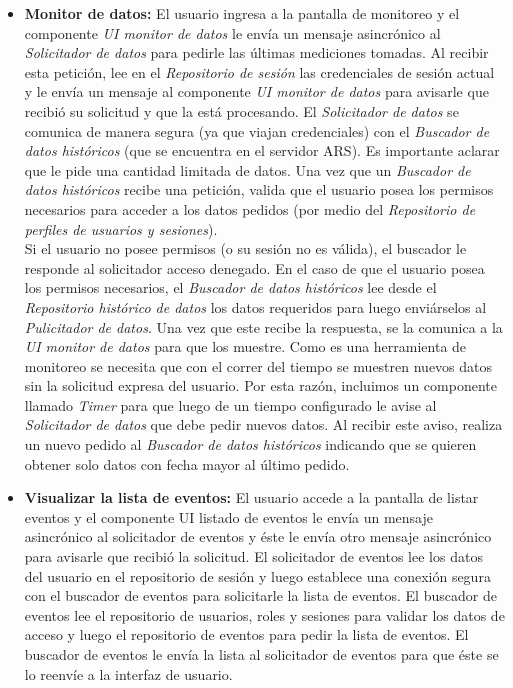 \begin{itemize}
    \item \textbf{Monitor de datos:} El usuario ingresa a la pantalla de monitoreo y el componente \textit{UI monitor de datos} le envía un mensaje asincrónico al \textit{Solicitador de datos} para pedirle las últimas mediciones tomadas. Al recibir esta petición, lee en el \textit{Repositorio de sesión} las credenciales de sesión actual y le envía un mensaje al componente \textit{UI monitor de datos} para avisarle que recibió su solicitud y que la está procesando. El \textit{Solicitador de datos} se comunica de manera segura (ya que viajan credenciales) con el \textit{Buscador de datos históricos} (que se encuentra en el servidor ARS). Es importante aclarar que le pide una cantidad limitada de datos. Una vez que un \textit{Buscador de datos históricos} recibe una petición, valida que el usuario posea los permisos necesarios para acceder a los datos pedidos (por medio del \textit{Repositorio de perfiles de usuarios y sesiones}). \\
    Si el usuario no posee permisos (o su sesión no es válida), el buscador le responde al solicitador acceso denegado. En el caso de que el usuario posea los permisos necesarios, el \textit{Buscador de datos históricos} lee desde el \textit{Repositorio histórico de datos} los datos requeridos para luego enviárselos al \textit{Pulicitador de datos}. Una vez que este recibe la respuesta, se la comunica a la \textit{UI monitor de datos} para que los muestre. Como es una herramienta de monitoreo se necesita que con el correr del tiempo se muestren nuevos datos sin la solicitud expresa del usuario. Por esta razón, incluimos un componente llamado \textit{Timer} para que luego de un tiempo configurado le avise al \textit{Solicitador de datos} que debe pedir nuevos datos. Al recibir este aviso, realiza un nuevo pedido al \textit{Buscador de datos históricos} indicando que se quieren obtener solo datos con fecha mayor al último pedido.
    \item \textbf{Visualizar la lista de eventos:} El usuario accede a la pantalla de listar eventos y el componente UI listado de eventos le envía un mensaje asincrónico al solicitador de eventos y éste le envía otro mensaje asincrónico para avisarle que recibió la solicitud. El solicitador de eventos lee los datos del usuario en el repositorio de sesión y luego establece una conexión segura con el buscador de eventos para solicitarle la lista de eventos. El buscador de eventos lee el repositorio de usuarios, roles y sesiones para validar los datos de acceso y luego el repositorio de eventos para pedir la lista de eventos. El buscador de eventos le envía la lista al solicitador de eventos para que éste se lo reenvíe a la interfaz de usuario. \\

\end{itemize}
